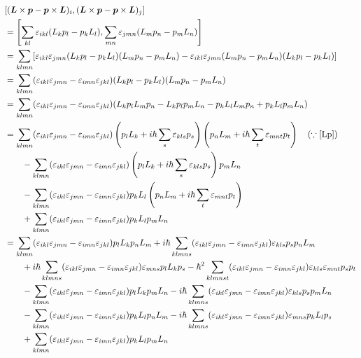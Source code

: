 \begin{align*}
  & [(\boldsymbol{L}\times\boldsymbol{p} - \boldsymbol{p}\times\boldsymbol{L})_i,(\boldsymbol{L}\times\boldsymbol{p} - \boldsymbol{p}\times\boldsymbol{L})_j] \\
  & = \left[\sum_{kl}\varepsilon_{ikl}(L_kp_l - p_kL_l),\sum_{mn}\varepsilon_{jmn}(L_mp_n - p_mL_n)\right]\\
  & = \sum_{klmn}[\varepsilon_{ikl}\varepsilon_{jmn}(L_kp_l - p_kL_l)(L_mp_n - p_mL_n) - \varepsilon_{ikl}\varepsilon_{jmn}(L_mp_n - p_mL_n)(L_kp_l - p_kL_l)]\\
  & = \sum_{klmn}(\varepsilon_{ikl}\varepsilon_{jmn} - \varepsilon_{imn}\varepsilon_{jkl})(L_kp_l - p_kL_l)(L_mp_n - p_mL_n)\\
  & = \sum_{klmn}(\varepsilon_{ikl}\varepsilon_{jmn} - \varepsilon_{imn}\varepsilon_{jkl})(L_kp_lL_mp_n - L_kp_lp_mL_n - p_kL_lL_mp_n + p_kL_lp_mL_n)\\
  & = \sum_{klmn}(\varepsilon_{ikl}\varepsilon_{jmn} - \varepsilon_{imn}\varepsilon_{jkl})\left(p_lL_k + i\hbar\sum_s\varepsilon_{kls}p_s\right)\left(p_nL_m + i\hbar\sum_t\varepsilon_{mnt}p_t\right)\quad(\because\eqref{Lp})\\
  & \qquad - \sum_{klmn}(\varepsilon_{ikl}\varepsilon_{jmn} - \varepsilon_{imn}\varepsilon_{jkl})\left(p_lL_k + i\hbar\sum_s\varepsilon_{kls}p_s\right)p_mL_n\\
  & \qquad - \sum_{klmn}(\varepsilon_{ikl}\varepsilon_{jmn} - \varepsilon_{imn}\varepsilon_{jkl})p_kL_l\left(p_nL_m + i\hbar\sum_t\varepsilon_{mnt}p_t\right)\\
  & \qquad  + \sum_{klmn}(\varepsilon_{ikl}\varepsilon_{jmn} - \varepsilon_{imn}\varepsilon_{jkl})p_kL_lp_mL_n\\
  & = \sum_{klmn}(\varepsilon_{ikl}\varepsilon_{jmn} - \varepsilon_{imn}\varepsilon_{jkl})p_lL_kp_nL_m + i\hbar\sum_{klmns}(\varepsilon_{ikl}\varepsilon_{jmn} - \varepsilon_{imn}\varepsilon_{jkl})\varepsilon_{kls}p_sp_nL_m\\
  & \qquad  + i\hbar\sum_{klmns}(\varepsilon_{ikl}\varepsilon_{jmn} - \varepsilon_{imn}\varepsilon_{jkl})\varepsilon_{mns}p_lL_kp_s - \hbar^2\sum_{klmnst}(\varepsilon_{ikl}\varepsilon_{jmn} - \varepsilon_{imn}\varepsilon_{jkl})\varepsilon_{kls}\varepsilon_{mnt}p_sp_t\\
  & \qquad - \sum_{klmn}(\varepsilon_{ikl}\varepsilon_{jmn} - \varepsilon_{imn}\varepsilon_{jkl})p_lL_kp_mL_n - i\hbar\sum_{klmns}(\varepsilon_{ikl}\varepsilon_{jmn} - \varepsilon_{imn}\varepsilon_{jkl})\varepsilon_{kls}p_sp_mL_n\\
  & \qquad - \sum_{klmn}(\varepsilon_{ikl}\varepsilon_{jmn} - \varepsilon_{imn}\varepsilon_{jkl})p_kL_lp_nL_m - i\hbar\sum_{klmns}(\varepsilon_{ikl}\varepsilon_{jmn} - \varepsilon_{imn}\varepsilon_{jkl})\varepsilon_{mns}p_kL_lp_s\\
  & \qquad  + \sum_{klmn}(\varepsilon_{ikl}\varepsilon_{jmn} - \varepsilon_{imn}\varepsilon_{jkl})p_kL_lp_mL_n
\end{align*}
